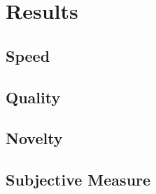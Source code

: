 \chapter{Results}
\label{results}

\section{Speed}
\label{results_speed}

\section{Quality}
\label{results_quality}

\section{Novelty}
\label{results_novelty}

\section{Subjective Measure}
\label{results_subjective}
